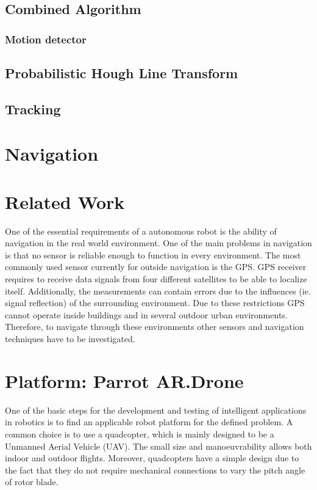 \documentclass[a4paper]{article}
\begin{document}
\subsection{Combined Algorithm}
\subsubsection{Motion detector}
\subsection{Probabilistic Hough Line Transform}
\subsection{Tracking}

\section{Navigation}


\section{Related Work}
One of the essential requirements of a autonomous robot is the ability of navigation in the real world environment. One of the main problems in navigation is that no sensor is reliable enough to function in every environment. The most commonly used sensor currently for outside navigation is the GPS. GPS receiver requires to receive data signals from four different satellites to be able to localize itself. Additionally, the measurements can contain errors due to the influences (ie. signal reflection) of the surrounding environment. Due to these restrictions GPS cannot operate inside buildings and in several outdoor urban environments. Therefore, to navigate through these environments other sensors and navigation techniques have to be investigated.

\section{Platform: Parrot AR.Drone}
\label{platform}
One of the basic steps for the development and testing of intelligent applications in robotics is to find an applicable robot platform for the defined problem. A common choice is to use a quadcopter, which is  mainly designed to be a Unmanned Aerial Vehicle (UAV). The small size and manoeuvrability allows both indoor and outdoor flights. Moreover, quadcopters have a simple design due to the fact that they do not require mechanical connections to vary the pitch angle of rotor blade.
\end{document}
